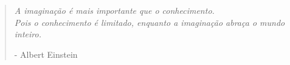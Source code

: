 
\vspace*{\fill}
\begin{quote}
	\epigraph{\textit{A imaginação é mais importante que o conhecimento. \\ Pois o conhecimento é limitado, enquanto a imaginação abraça o mundo inteiro.}}{- Albert Einstein}
\end{quote}